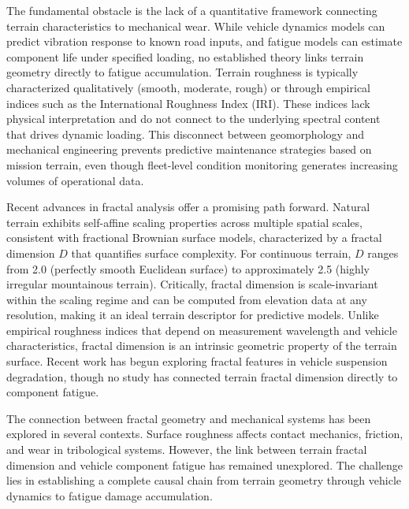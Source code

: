 \documentclass[11pt]{article}
\begin{document}
The fundamental obstacle is the lack of a quantitative framework connecting terrain characteristics to mechanical wear. While vehicle dynamics models can predict vibration response to known road inputs\cite{Wong2022,Gillespie1992}, and fatigue models can estimate component life under specified loading\cite{Basquin1910,Dowling2013}, no established theory links terrain geometry directly to fatigue accumulation. Terrain roughness is typically characterized qualitatively (smooth, moderate, rough) or through empirical indices such as the International Roughness Index (IRI)\cite{ISO8608}. These indices lack physical interpretation and do not connect to the underlying spectral content that drives dynamic loading. This disconnect between geomorphology and mechanical engineering prevents predictive maintenance strategies based on mission terrain, even though fleet-level condition monitoring generates increasing volumes of operational data\cite{Zhu2019}.

Recent advances in fractal analysis offer a promising path forward. Natural terrain exhibits self-affine scaling properties across multiple spatial scales\cite{Mandelbrot1982,Sayles1978,Persson2005}, consistent with fractional Brownian surface models\cite{MandelbrotVanNess1968,Mandelbrot1982}, characterized by a fractal dimension $D$ that quantifies surface complexity. For continuous terrain, $D$ ranges from 2.0 (perfectly smooth Euclidean surface) to approximately 2.5 (highly irregular mountainous terrain). Critically, fractal dimension is scale-invariant within the scaling regime and can be computed from elevation data at any resolution, making it an ideal terrain descriptor for predictive models. Unlike empirical roughness indices that depend on measurement wavelength and vehicle characteristics, fractal dimension is an intrinsic geometric property of the terrain surface. Recent work has begun exploring fractal features in vehicle suspension degradation\cite{Braut2023}, though no study has connected terrain fractal dimension directly to component fatigue.

The connection between fractal geometry and mechanical systems has been explored in several contexts. Surface roughness affects contact mechanics, friction, and wear in tribological systems\cite{Persson2005}. However, the link between terrain fractal dimension and vehicle component fatigue has remained unexplored. The challenge lies in establishing a complete causal chain from terrain geometry through vehicle dynamics to fatigue damage accumulation.
\end{document}
